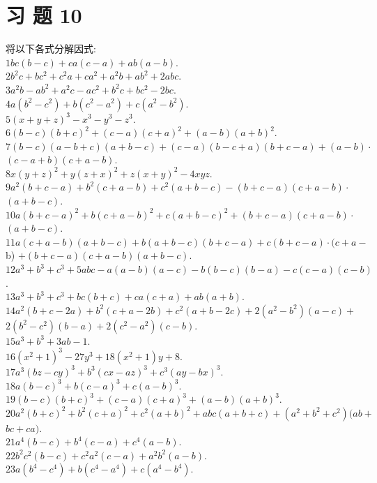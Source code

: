 \documentclass[10pt]{article}
\begin{document}
\section*{习 题 10}
将以下各式分解因式:\\
$1 b c(b-c)+c a(c-a)+a b(a-b)$.\\
$2 b^{2} c+b c^{2}+c^{2} a+c a^{2}+a^{2} b+a b^{2}+2 a b c$.\\
$3 a^{2} b-a b^{2}+a^{2} c-a c^{2}+b^{2} c+b c^{2}-2 b c$.\\
$4 a\left(b^{2}-c^{2}\right)+b\left(c^{2}-a^{2}\right)+c\left(a^{2}-b^{2}\right)$.\\
$5(x+y+z)^{3}-x^{3}-y^{3}-z^{3}$.\\
$6(b-c)(b+c)^{2}+(c-a)(c+a)^{2}+(a-b)(a+b)^{2}$.\\
$7(b-c)(a-b+c)(a+b-c)+(c-a)(b-c+a)(b+c-a)+(a-b) \cdot$ $(c-a+b)(c+a-b)$.\\
$8 x(y+z)^{2}+y(z+x)^{2}+z(x+y)^{2}-4 x y z$.\\
$9 a^{2}(b+c-a)+b^{2}(c+a-b)+c^{2}(a+b-c)-(b+c-a)(c+a-b) \cdot$ $(a+b-c)$.\\
$10 a(b+c-a)^{2}+b(c+a-b)^{2}+c(a+b-c)^{2}+(b+c-a)(c+a-b) \cdot$ $(a+b-c)$.\\
$11 a(c+a-b)(a+b-c)+b(a+b-c)(b+c-a)+c(b+c-a) \cdot(c+a-$ b) $+(b+c-a)(c+a-b)(a+b-c)$.\\
$12 a^{3}+b^{3}+c^{3}+5 a b c-a(a-b)(a-c)-b(b-c)(b-a)-c(c-a)(c-b)$.\\
$13 a^{3}+b^{3}+c^{3}+b c(b+c)+c a(c+a)+a b(a+b)$.\\
$14 a^{2}(b+c-2 a)+b^{2}(c+a-2 b)+c^{2}(a+b-2 c)+2\left(a^{2}-b^{2}\right)(a-c)+$ $2\left(b^{2}-c^{2}\right)(b-a)+2\left(c^{2}-a^{2}\right)(c-b)$.\\
$15 a^{3}+b^{3}+3 a b-1$.\\
$16\left(x^{2}+1\right)^{3}-27 y^{3}+18\left(x^{2}+1\right) y+8$.\\
$17 a^{3}(b z-c y)^{3}+b^{3}(c x-a z)^{3}+c^{3}(a y-b x)^{3}$.\\
$18 a(b-c)^{3}+b(c-a)^{3}+c(a-b)^{3}$.\\
$19(b-c)(b+c)^{3}+(c-a)(c+a)^{3}+(a-b)(a+b)^{3}$.\\
$20 a^{2}(b+c)^{2}+b^{2}(c+a)^{2}+c^{2}(a+b)^{2}+a b c(a+b+c)+\left(a^{2}+b^{2}+c^{2}\right)(a b+$ $b c+c a)$.\\
$21 a^{4}(b-c)+b^{4}(c-a)+c^{4}(a-b)$.\\
$22 b^{2} c^{2}(b-c)+c^{2} a^{2}(c-a)+a^{2} b^{2}(a-b)$.\\
$23 a\left(b^{4}-c^{4}\right)+b\left(c^{4}-a^{4}\right)+c\left(a^{4}-b^{4}\right)$.\\
\end{document}
